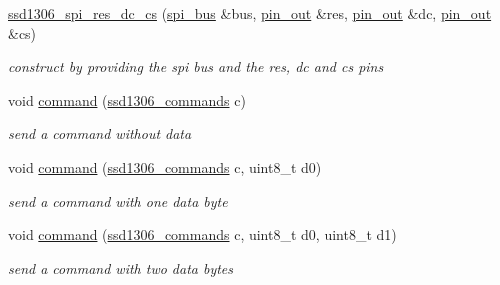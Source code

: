 \begin{DoxyCompactItemize}
\item 
\mbox{\label{classhwlib_1_1ssd1306__spi__res__dc__cs_ac503ccd62adc6e5e66747139a178fe9d}} 
\hyperlink{classhwlib_1_1ssd1306__spi__res__dc__cs_ac503ccd62adc6e5e66747139a178fe9d}{ssd1306\+\_\+spi\+\_\+res\+\_\+dc\+\_\+cs} (\hyperlink{classhwlib_1_1spi__bus}{spi\+\_\+bus} \&bus, \hyperlink{classhwlib_1_1pin__out}{pin\+\_\+out} \&res, \hyperlink{classhwlib_1_1pin__out}{pin\+\_\+out} \&dc, \hyperlink{classhwlib_1_1pin__out}{pin\+\_\+out} \&cs)
\begin{DoxyCompactList}\small\item\em construct by providing the spi bus and the res, dc and cs pins \end{DoxyCompactList}\item 
\mbox{\label{classhwlib_1_1ssd1306__spi__res__dc__cs_a7ffb61960736c14092cc21631591d01f}} 
void \hyperlink{classhwlib_1_1ssd1306__spi__res__dc__cs_a7ffb61960736c14092cc21631591d01f}{command} (\hyperlink{namespacehwlib_a9dcd26ad4dc21c1a72b57fb76f65e811}{ssd1306\+\_\+commands} c)
\begin{DoxyCompactList}\small\item\em send a command without data \end{DoxyCompactList}\item 
\mbox{\label{classhwlib_1_1ssd1306__spi__res__dc__cs_a14e35540ddcda48310436719d4894f5c}} 
void \hyperlink{classhwlib_1_1ssd1306__spi__res__dc__cs_a14e35540ddcda48310436719d4894f5c}{command} (\hyperlink{namespacehwlib_a9dcd26ad4dc21c1a72b57fb76f65e811}{ssd1306\+\_\+commands} c, uint8\+\_\+t d0)
\begin{DoxyCompactList}\small\item\em send a command with one data byte \end{DoxyCompactList}\item 
\mbox{\label{classhwlib_1_1ssd1306__spi__res__dc__cs_a3e5b5742b5d8ab8bb198a14d1d1a57a8}} 
void \hyperlink{classhwlib_1_1ssd1306__spi__res__dc__cs_a3e5b5742b5d8ab8bb198a14d1d1a57a8}{command} (\hyperlink{namespacehwlib_a9dcd26ad4dc21c1a72b57fb76f65e811}{ssd1306\+\_\+commands} c, uint8\+\_\+t d0, uint8\+\_\+t d1)
\begin{DoxyCompactList}\small\item\em send a command with two data bytes \end{DoxyCompactList}\item 

\end{DoxyCompactItemize}
